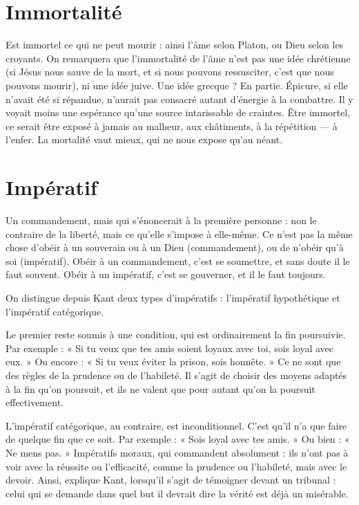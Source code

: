 \section{Immortalité}
Est immortel ce qui ne peut mourir : ainsi l’âme selon
Platon, ou Dieu selon les croyants. On remarquera que
l’immortalité de l’âme n’est pas une idée chrétienne (si Jésus nous sauve de la
mort, et si nous pouvons ressusciter, c’est que nous pouvons mourir), ni une
idée juive. Une idée grecque ? En partie. Épicure, si elle n’avait été si répandue,
n'aurait pas consacré autant d'énergie à la combattre. Il y voyait moins une
espérance qu’une source intarissable de craintes. Être immortel, ce serait être
exposé à jamais au malheur, aux châtiments, à la répétition — à l’enfer. La mortalité
vaut mieux, qui ne nous expose qu’au néant.

\section{Impératif}
Un commandement, mais qui s’énoncerait à la première personne :
non le contraire de la liberté, mais ce qu’elle s'impose
à elle-même. Ce n’est pas la même chose d’obéir à un souverain ou à un Dieu
(commandement), ou de n’obéir qu’à soi (impératif). Obéir à un commandement,
c’est se soumettre, et sans doute il le faut souvent. Obéir à un impératif,
c’est se gouverner, et il le faut toujours.

On distingue depuis Kant deux types d’impératifs : l'impératif hypothétique
et l’impératif catégorique.

Le premier reste soumis à une condition, qui est ordinairement la fin poursuivie.
Par exemple : « Si tu veux que tes amis soient loyaux avec toi, sois loyal
avec eux. » Ou encore : « Si tu veux éviter la prison, sois honnête. » Ce ne sont
que des règles de la prudence ou de l’habileté. Il s’agit de choisir des moyens
adaptés à la fin qu’on poursuit, et ils ne valent que pour autant qu’on la poursuit
effectivement.

L’impératif catégorique, au contraire, est inconditionnel. C’est qu’il n’a
que faire de quelque fin que ce soit. Par exemple : « Sois loyal avec tes amis. »
Ou bien : « Ne mens pas. » Impératifs moraux, qui commandent absolument :
ils n’ont pas à voir avec la réussite ou l'efficacité, comme la prudence ou l’habileté,
mais avec le devoir. Ainsi, explique Kant, lorsqu'il s’agit de témoigner
devant un tribunal : celui qui se demande dans quel but il devrait dire la vérité
est déjà un misérable.

